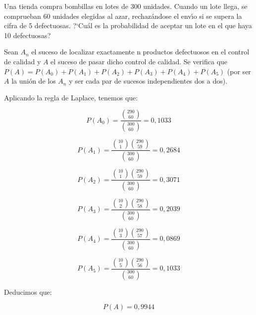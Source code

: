 \problem
Una tienda compra bombillas en lotes de 300 unidades. Cuando  un  lote  llega,  se
comprueban 60 unidades elegidas al azar, rechaz{\'a}ndose el  env{\'\i}o  si  se
supera la cifra de 5 defectuosas. ?`Cu{\'a}l es la probabilidad  de  aceptar
un lote en el que haya 10 defectuosas?

Sean $A_n$ el suceso de localizar exactamente n productos defectuosos en el control de calidad y $A$ el suceso de pasar dicho control de calidad. Se verifica que $P(A)=P(A_0)+P(A_1)+P(A_2)+P(A_3)+P(A_4)+P(A_5)$ (por ser $A$ la unión de los $A_n$ y ser cada par de sucesos independientes dos a dos). 
	
	Aplicando la regla de Laplace, tenemos que:
	
	$$P(A_0)=\frac{{290 \choose 60}} {{300 \choose 60}} = 0,1033$$
	
	$$P(A_1)=\frac{{10 \choose 1}{290 \choose 59}} {{300 \choose 60}} = 0,2684$$
	
	$$P(A_2)=\frac{{10 \choose 1}{290 \choose 59}} {{300 \choose 60}} = 0,3071$$
	
	$$P(A_3)=\frac{{10 \choose 2}{290 \choose 58}} {{300 \choose 60}} = 0,2039$$
	
	$$P(A_4)=\frac{{10 \choose 3}{290 \choose 57}} {{300 \choose 60}} = 0,0869$$
	
	$$P(A_5)=\frac{{10 \choose 5}{290 \choose 56}} {{300 \choose 60}} = 0,1033$$
	
	Deducimos que:
	
	$$P(A) = 0,9944$$